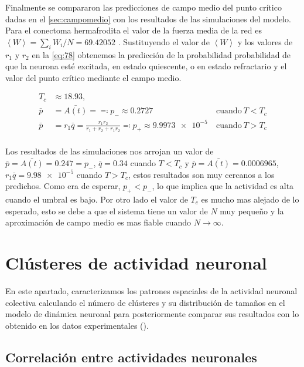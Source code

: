 Finalmente se compararon  las predicciones de campo medio del punto crítico  dadas en el \cref{sec:campomedio} con los resultados de las simulaciones del modelo.  Para el conectoma hermafrodita  el valor de la fuerza media de la red es $\left\langle W \right\rangle = \sum_i W_i/N=69.42052$ .  Sustituyendo el valor de $\left\langle W \right\rangle $  y los valores de $r_1$ y $r_2$ en la \cref{eq:78} obtenemos la predicción de la probabilidad probabilidad de que la neurona  esté excitada,  en estado quiescente,  o en estado refractario  y el valor del punto crítico mediante el campo medio.


\begin{equation}\label{eq:79}
	\begin{aligned}
		T_c & \approx 18.93 ,	\\
		\bar{p}&=\bar{A(t)}= \eqqcolon p_{-} \approx 0.2727 &\ \text{cuando} \ T<T_c \\
		\bar{p} &= r_1\bar{q} = \frac{r_1r_2}{r_1+r_2+r_1r_2}\eqqcolon p_{+}  \approx \num{9.9973e-5} &\ \text{cuando} \ T>T_c\\
	\end{aligned}
\end{equation}

Los resultados de las simulaciones nos arrojan un valor de  $\bar{p}=\bar{A(t)}=0.247=p_{-}$, $\bar{q} = 0.34$ cuando $T<T_c$ y $\bar{p}=\bar{A(t)}=0.0006965$, $r_1\bar{q} = \num{9.98e-5}$  cuando $T>T_c$, estos resultados son muy cercanos a los predichos. Como era de esperar, $p_{+} < p_{-}$, lo que implica que la actividad es alta cuando el umbral es bajo. Por otro lado el valor de $T_c$ es mucho mas alejado de lo esperado, esto se debe a que el sistema tiene un valor de $N$ muy pequeño y la aproximación de campo medio es mas fiable cuando $N\to\infty$.




\section{Clústeres de actividad neuronal }\label{sec:actividad_neuronal_modelo}

En este apartado, caracterizamos los patrones espaciales de la actividad neuronal colectiva calculando el número de clústeres y su distribución de tamaños  en el modelo de dinámica neuronal para posteriormente comparar sus resultados  con lo obtenido en los datos experimentales ().  

\subsection{Correlación entre actividades neuronales }\label{sec:correlacion_modelo}


